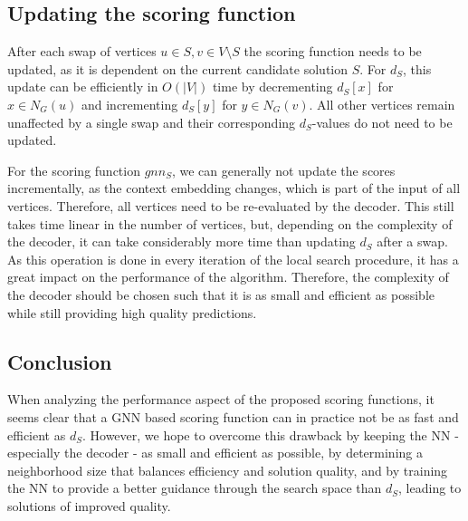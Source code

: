 \documentclass[draft,final]{vutinfth} %
\begin{document}
\subsection{Updating the scoring function}
After each swap of vertices $u \in S, v \in V \setminus S$ the scoring function needs to be updated, as it is dependent on the current candidate solution $S$. For $d_S$, this update can be efficiently in $O(|V|)$ time by decrementing $d_S[x]$ for $x \in N_G(u)$ and incrementing $d_S[y]$ for $y \in N_G(v)$. All other vertices remain unaffected by a single swap and their corresponding $d_S$-values do not need to be updated. 

For the scoring function $gnn_S$, we can generally not update the scores incrementally, as the context embedding changes, which is part of the input of all vertices. Therefore, all vertices need to be re-evaluated by the decoder. This still takes time linear in the number of vertices, but, depending on the complexity of the decoder, it can take considerably more time than updating $d_S$ after a swap. As this operation is done in every iteration of the local search procedure, it has a great impact on the performance of the algorithm. Therefore, the complexity of the decoder should be chosen such that it is as small and efficient as possible while still providing high quality predictions. 

\subsection{Conclusion}
When analyzing the performance aspect of the proposed scoring functions, it seems clear that a GNN based scoring function can in practice not be as fast and efficient as $d_S$. However, we hope to overcome this drawback by keeping the NN - especially the decoder - as small and efficient as possible, by determining a neighborhood size that balances efficiency and solution quality, and by training the NN to provide a better guidance through the search space than $d_S$, leading to solutions of improved quality. 


\end{document}
